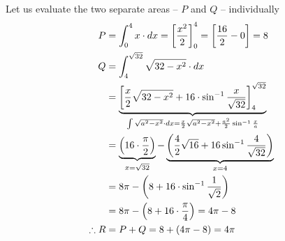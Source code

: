 \documentclass[14pt,fleqn]{extarticle}
\begin{document}
Let us evaluate the two separate areas -- $P$ and $Q$ -- individually 
\begin{align}
P &= \int_0^4 x\cdot dx = \left[\frac{x^2}{2} \right]_0^4 = \left[\frac{16}{2}-0 \right] = 8\\
Q &= \int_4^{\sqrt{32}}\sqrt{32-x^2}\cdot dx \\
&= \underbrace{\left[\frac{x}{2}\sqrt{32-x^2} + 16\cdot \sin^{-1} \frac{x}{\sqrt{32}} \right]_4^{\sqrt{32}}}_{\int \sqrt{a^2-x^2}\cdot dx = \frac{x}{2}\sqrt{a^2-x^2} + \frac{a^2}{2}\sin^{-1} \frac{x}{a}} \\
&= \underbrace{\left(16\cdot \frac{\pi}{2}\right)}_{x = \sqrt{32}} - \underbrace{\left(\frac{4}{2}\sqrt{16} + 16\sin^{-1} \frac{4}{\sqrt{32}} \right)}_{x=4} \\
&= 8\pi - \left(8 + 16\cdot \sin^{-1}\frac{1}{\sqrt{2}} \right) \\
&= 8\pi - \left(8 + 16\cdot \frac{\pi}{4} \right) = 4\pi - 8 \\
\therefore R &= P + Q = 8 + \left(4\pi-8 \right) = 4\pi
\end{align}
\end{document}
